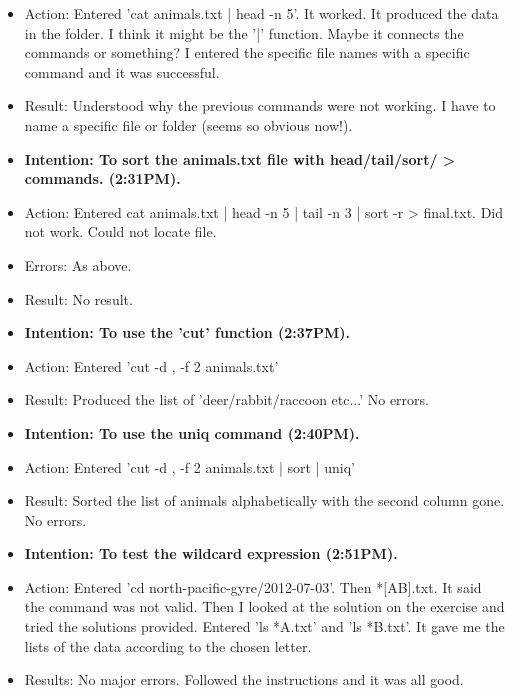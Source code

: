 \documentclass[a4paper,12pt]{article}
\begin{document}
\begin{itemize}
\begin{itemize}
\item Action: Entered 'cat animals.txt | head -n 5'. It worked. It produced the data in the folder. I think it might be the '|' function. Maybe it connects the commands or something? I entered the specific file names with a specific command and it was successful.

\item Result: Understood why the previous commands were not working. I have to name a specific file or folder (seems so obvious now!). 

\item \textbf{Intention: To sort the animals.txt file with head/tail/sort/ > commands. (2:31PM).}

\item Action: Entered cat animals.txt | head -n 5 | tail -n 3 | sort -r > final.txt. Did not work. Could not locate file. 

\item Errors: As above.

\item Result: No result. 

\item \textbf {Intention: To use the 'cut' function (2:37PM).}

\item Action: Entered 'cut -d , -f 2 animals.txt'

\item Result: Produced the list of 'deer/rabbit/raccoon etc...' No errors. 

\item \textbf{Intention: To use the uniq command (2:40PM).}

\item Action: Entered 'cut -d , -f 2 animals.txt | sort | uniq'

\item Result: Sorted the list of animals alphabetically with the second column gone. No errors. 

\item \textbf{Intention: To test the wildcard expression (2:51PM).} 

\item Action: Entered 'cd north-pacific-gyre/2012-07-03'. Then *[AB].txt. It said the command was not valid. Then I looked at the solution on the exercise and tried the solutions provided. Entered 'ls *A.txt' and 'ls *B.txt'. It gave me the lists of the data according to the chosen letter. 

\item Results: No major errors. Followed the instructions and it was all good. 





\end{itemize}
\end{itemize}
\end{document}
